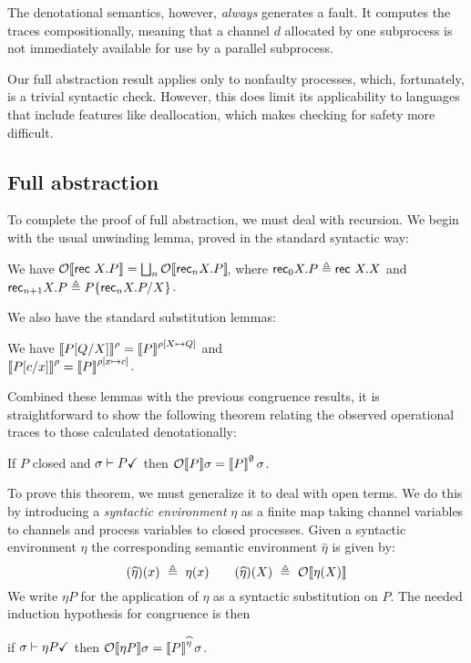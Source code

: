 \documentclass{entcs}
\begin{document}
The denotational semantics, however, \emph{always} generates a fault.
It computes the traces compositionally, meaning that a channel $d$
allocated by one subprocess is not immediately available for use by a
parallel subprocess.

Our full abstraction result applies only to nonfaulty processes,
which, fortunately, is a trivial syntactic check.  However, this does
limit its applicability to languages that include features like
deallocation, which makes checking for safety more difficult.








\subsection{Full abstraction}

To complete the proof of full abstraction, we must deal with
recursion.  We begin with the usual unwinding lemma, proved in the
standard syntactic way:

\begin{lemma}[Unwinding]
  We have
  $\ObB{\rec X.P} = \biglub_n \Ob{\recB_n X.P}$, where $\textsf{rec}_0 X.P \triangleq
  \textsf{rec } X. X$ and $\textsf{rec}_{n+1} X.P \triangleq P\{\textsf{rec}_n X.P/X\}$.
\end{lemma}

We also have the standard substitution lemmas:
\begin{lemma}[Substitution]
  We have
  $\left\llbracket P[Q/X] \right\rrbracket^{\rho} = \left\llbracket P \right\rrbracket^{\rho[X \mapsto Q]}$ and\\
  $\left\llbracket P[c/x] \right\rrbracket^{\rho} = \left\llbracket P \right\rrbracket^{\rho[x \mapsto c]}$.
\end{lemma}

\noindent
Combined these lemmas with the previous congruence results, it is
straightforward to show the following theorem relating the observed
operational traces to those calculated denotationally:

\begin{theorem}[Congruence]
  If $P$ closed and $\sigma \vdash P \checkmark$ then
  $\mathcal{O}\!\left\llbracket P \right\rrbracket \! \sigma = \left\llbracket P \right\rrbracket^{\emptyset}\sigma$.
\end{theorem}
\noindent
To prove this theorem, we must generalize it to deal with open terms.
We do this by introducing a \emph{syntactic environment} $\eta$ as a
finite map taking channel variables to channels and process variables
to closed processes.  Given a syntactic environment $\eta$ the
corresponding semantic environment $\widehat{\eta}$ is given by:
\[
  (\widehat{\eta})(x)\ \eqdef\ \eta(x) \qquad
  (\widehat{\eta})(X)\ \eqdef\ \ObB{\eta(X)}
\]
We write $\eta P$ for the application of $\eta$ as a syntactic
substitution on $P$.  The needed induction hypothesis for congruence
is then 
\begin{center}
if $\sigma \vdash \eta P \checkmark$ then $\mathcal{O}\!\left\llbracket \eta P \right\rrbracket \! \sigma = \left\llbracket P \right\rrbracket^{\widehat{\eta}}\sigma$.
\end{center}
\end{document}
